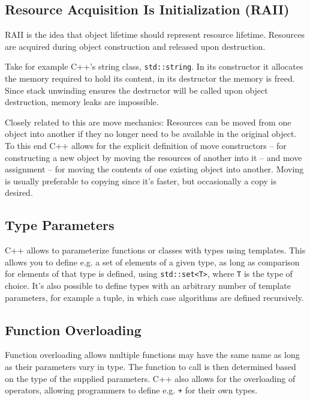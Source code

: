 		\subsection{Resource Acquisition Is Initialization (RAII)}
		
		RAII is the idea that object lifetime should represent resource lifetime. Resources are acquired during object construction and released upon destruction.
		
		Take for example C++'s string class, \lstinline$std::string$. In its constructor it allocates the memory required to hold its content, in its destructor the memory is freed. Since stack unwinding ensures the destructor will be called upon object destruction, memory leaks are impossible.
		
		Closely related to this are move mechanics: Resources can be moved from one object into another if they no longer need to be available in the original object. To this end C++ allows for the explicit definition of move constructors -- for constructing a new object by moving the resources of another into it -- and move assignment -- for moving the contents of one existing object into another. Moving is usually preferable to copying since it's faster, but occasionally a copy is desired.
		
		\subsection{Type Parameters}
		
		C++ allows to parameterize functions or classes with types using templates. This allows you to define e.g. a set of elements of a given type, as long as comparison for elements of that type is defined, using \lstinline$std::set<T>$, where \lstinline$T$ is the type of choice. It's also possible to define types with an arbitrary number of template parameters, for example a tuple, in which case algorithms are defined recursively.
		
		\subsection{Function Overloading}
		
		Function overloading allows multiple functions may have the same name as long as their parameters vary in type. The function to call is then determined based on the type of the supplied parameters. C++ also allows for the overloading of operators, allowing programmers to define e.g. \lstinline$+$ for their own types.
		
